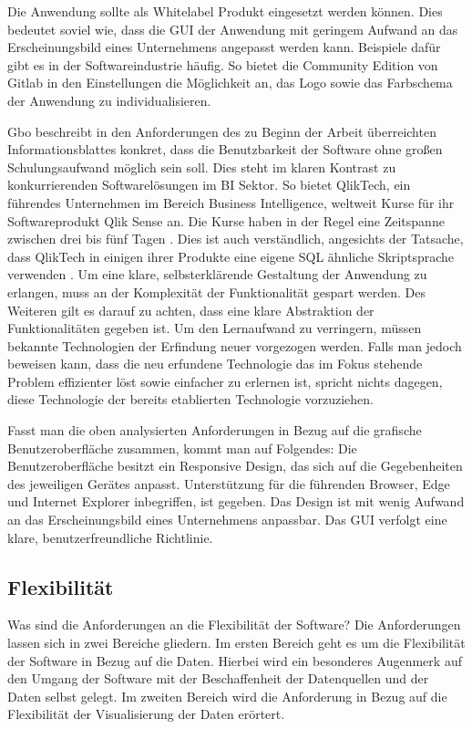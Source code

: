 Die Anwendung sollte als Whitelabel Produkt eingesetzt werden können. Dies bedeutet soviel wie,
dass die GUI der Anwendung mit geringem Aufwand an das Erscheinungsbild eines Unternehmens angepasst
werden kann. Beispiele dafür gibt es in der Softwareindustrie häufig. So bietet die Community
Edition von Gitlab in den Einstellungen die Möglichkeit an, das Logo sowie das Farbschema der Anwendung
zu individualisieren.\cite{GitlabDocs}

Gbo beschreibt in den Anforderungen des zu Beginn der Arbeit überreichten
Informationsblattes konkret, dass die Benutzbarkeit der Software ohne großen Schulungsaufwand möglich sein soll.
Dies steht im klaren Kontrast zu konkurrierenden Softwarelösungen im BI Sektor.
So bietet QlikTech, ein führendes Unternehmen im Bereich Business Intelligence,
weltweit Kurse für ihr Softwareprodukt Qlik Sense an. Die Kurse haben in der
Regel eine Zeitspanne zwischen drei bis fünf Tagen \cite{QlikSenseTraining}.
Dies ist auch verständlich, angesichts der Tatsache, dass QlikTech in einigen
ihrer Produkte eine eigene SQL ähnliche Skriptsprache verwenden \cite{QlikSenseScriptLanguage}.
Um eine klare, selbsterklärende Gestaltung der Anwendung zu erlangen,
muss an der Komplexität der Funktionalität gespart werden. Des Weiteren
gilt es darauf zu achten, dass eine klare Abstraktion der Funktionalitäten
gegeben ist. Um den Lernaufwand zu verringern, müssen bekannte Technologien
der Erfindung neuer vorgezogen werden. Falls man jedoch beweisen kann,
dass die neu erfundene Technologie das im Fokus stehende Problem effizienter löst
sowie einfacher zu erlernen ist, spricht nichts dagegen, diese Technologie der bereits
etablierten Technologie vorzuziehen.

Fasst man die oben analysierten Anforderungen in Bezug auf die grafische Benutzeroberfläche
zusammen, kommt man auf Folgendes: Die Benutzeroberfläche besitzt ein Responsive Design,
das sich auf die Gegebenheiten des jeweiligen Gerätes anpasst. Unterstützung
für die führenden Browser, Edge und Internet Explorer inbegriffen, ist gegeben.
Das Design ist mit wenig Aufwand an das Erscheinungsbild eines Unternehmens anpassbar.
Das GUI verfolgt eine klare, benutzerfreundliche Richtlinie.

\subsection{Flexibilität}
\label{subsec:flexibilitaet}
Was sind die Anforderungen an die Flexibilität der Software? Die Anforderungen lassen sich in zwei
Bereiche gliedern. Im ersten Bereich geht es um die Flexibilität der Software in Bezug auf die Daten. Hierbei wird ein besonderes
Augenmerk auf den Umgang der Software mit der Beschaffenheit der Datenquellen und der Daten selbst gelegt. Im zweiten Bereich
wird die Anforderung in Bezug auf die Flexibilität der Visualisierung der Daten erörtert.


